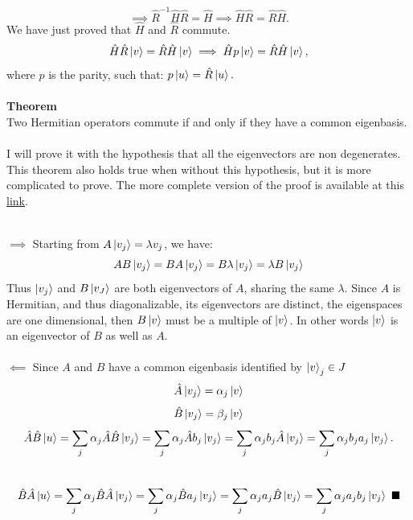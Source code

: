 \documentclass{article}
\begin{document}
$$\implies \hat{R}^{-1}\hat{H}\hat{R}=\hat{H} \implies \hat{H}\hat{R} = \hat{R}\hat{H}. $$
We have just proved that $\hat{H}$ and $\hat{R}$ commute.
$$\hat{H}\hat{R}\ket{v}=\hat{R}\hat{H}\ket{v} \implies \hat{H}p\ket{v} = \hat{R}\hat{H}\ket{v},$$
where $p$ is the parity, such that: $p\ket{u} = \hat{R}\ket{u}.$ \\  \\
\textbf{Theorem}\\
Two Hermitian operators commute if and only if they have a common eigenbasis. \\ \\
I will prove it with the hypothesis that all the eigenvectors are non degenerates.  This theorem also holds true when without this hypothesis, but it is more complicated to prove. The more complete version of the proof is available at this
\href{https://ocw.mit.edu/courses/8-04-quantum-physics-i-spring-2013/9ccc9fd132124dd102e1a7863e6e12ce_MIT8_04S13_OnCommEigenbas.pdf#page=3}{link}.
\\ \\

$\implies$ Starting from $A\ket{v_j}=\lambda{v_j}$, we have:
$$AB\ket{v_j} = BA\ket{v_j} = B \lambda \ket{v_j} = \lambda B\ket{v_j}$$
Thus $\ket{v_j}$ and $B\ket{v_J}$ are both eigenvectors of $A$, sharing the same $\lambda$. Since  $A$ is Hermitian, and thus diagonalizable, its eigenvectors are distinct, the eigenspaces are one dimensional, then $B\ket{v}$ must be a multiple of $\ket{v}$. In other words $\ket{v}$ is an eigenvector of $B$ as well as $A$.\\ \\
$\impliedby$ Since $A$ and $B$ have a common eigenbasis identified by $\ket{v}_j \in J$ 
$$\hat{A}\ket{v_j} = \alpha_j \ket{v}$$ 
$$\hat{B}\ket{v_j} = \beta_j \ket{v}$$ 
$$ \hat{A}\hat{B} \ket{u} = \sum_j \alpha_j \hat{A}\hat{B} \ket{v_j} = \sum_j \alpha_j \hat{A} b_j \ket{v_j} =  \sum_j \alpha_j  b_j \hat{A} \ket{v_j} = \sum_j \alpha_j b_j a_j \ket{v_j}. $$ \\ 
$$\hat{B}\hat{A}\ket{u}= \sum_j \alpha_j \hat{B}\hat{A}\ket{v_j} = \sum_j \alpha_j \hat{B}a_j \ket{v_j} = \sum_j \alpha_j a_j \hat{B}\ket{v_j} = \sum_j \alpha_j a_j b_j \ket{v_j} \ \blacksquare$$
\end{document}
